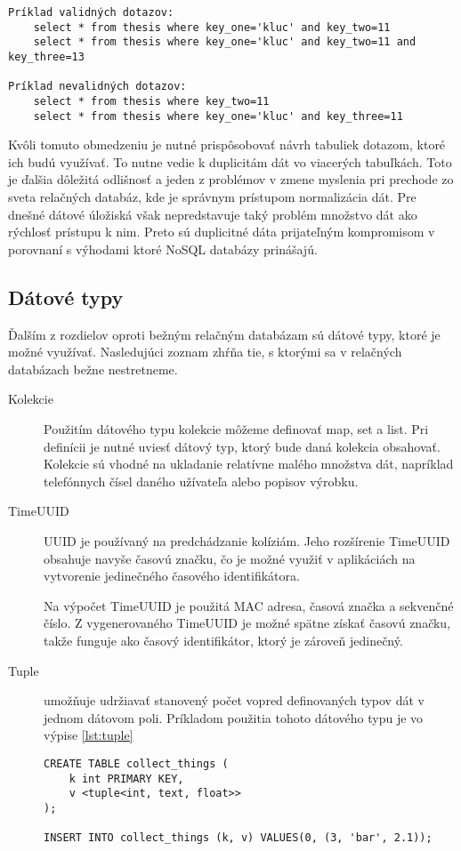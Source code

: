 	\begin{lstlisting}[label=lst:cql-pk-use,caption=Príklad vyhľadávanie v tabuľke thesis]
Príklad validných dotazov:
	select * from thesis where key_one='kluc' and key_two=11
	select * from thesis where key_one='kluc' and key_two=11 and key_three=13
		
Príklad nevalidných dotazov:
	select * from thesis where key_two=11
	select * from thesis where key_one='kluc' and key_three=11
	\end{lstlisting}
	
	Kvôli tomuto obmedzeniu je nutné prispôsobovať návrh tabuliek dotazom, ktoré ich budú využívať. To nutne vedie k duplicitám dát vo viacerých tabuľkách. Toto je ďalšia dôležitá odlišnosť a jeden z problémov v zmene myslenia pri prechode zo sveta relačných databáz, kde je správnym prístupom normalizácia dát. Pre dnešné dátové úložiská však nepredstavuje taký problém množstvo dát ako rýchlosť prístupu k nim. Preto sú duplicitné dáta prijateľným kompromisom v porovnaní s výhodami ktoré NoSQL databázy prinášajú.

	\subsection{Dátové typy}
	Ďalším z rozdielov oproti bežným relačným databázam sú dátové typy, ktoré je možné využívať. Nasledujúci zoznam zhŕňa tie, s ktorými sa v relačných databázach bežne nestretneme.
	\begin{description}
		\item[Kolekcie] Použitím dátového typu kolekcie môžeme definovať map, set a list. Pri definícii je nutné uviesť dátový typ, ktorý bude daná kolekcia obsahovať. Kolekcie sú vhodné na ukladanie relatívne malého množstva dát, napríklad telefónnych čísel daného užívateľa alebo popisov výrobku. 

		\item[TimeUUID] UUID je používaný na predchádzanie kolíziám. Jeho rozšírenie TimeUUID obsahuje navyše časovú značku, čo je možné využiť v aplikáciách na vytvorenie jedinečného časového identifikátora.
		
		Na výpočet TimeUUID je použitá MAC adresa, časová značka a sekvenčné číslo. Z vygenerovaného TimeUUID je možné spätne získať časovú značku, takže funguje ako časový identifikátor, ktorý je zároveň jedinečný.
		
		\item[Tuple] umožňuje udržiavať stanovený počet vopred definovaných typov dát v jednom dátovom poli. Príkladom použitia tohoto dátového typu je vo výpise \ref{lst:tuple}

		\begin{lstlisting}[label=lst:tuple,caption=Príklad použitia dátového typu tuple]
CREATE TABLE collect_things (
	k int PRIMARY KEY,
	v <tuple<int, text, float>>
);

INSERT INTO collect_things (k, v) VALUES(0, (3, 'bar', 2.1));
		\end{lstlisting}
	\end{description}

